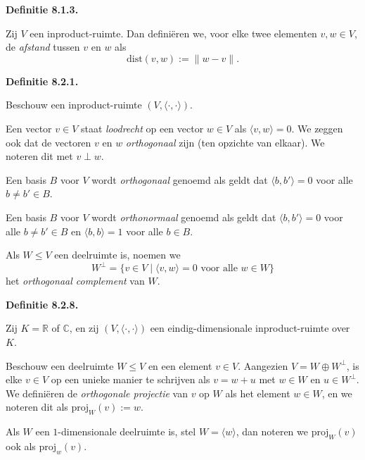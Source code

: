 \documentclass[10pt,a4paper]{article}
\newenvironment{res}[1]{%
  \par\noindent\textbf{Definitie #1.}~\ignorespaces
}{%
  \par\vspace{2pt}\normalfont
}
\begin{document}
\begin{res}{8.1.3}
Zij $V$ een inproduct-ruimte. Dan defini\"eren we, voor elke twee elementen $v,w\in V$, de \textit{afstand} tussen $v$ en $w$ als
\[
\mathrm{dist}(v,w):=\|w-v\|.
\]
\end{res}

\begin{res}{8.2.1}
Beschouw een inproduct-ruimte $(V,\langle\cdot,\cdot\rangle)$.
\begin{myenum}
\item Een vector $v\in V$ staat \textit{loodrecht} op een vector $w\in V$ als $\langle v,w\rangle=0$. We zeggen ook dat de vectoren $v$ en $w$ \textit{orthogonaal} zijn (ten opzichte van elkaar). We noteren dit met $v\perp w$.
\item Een basis $B$ voor $V$ wordt \textit{orthogonaal} genoemd als geldt dat $\langle b,b'\rangle=0$ voor alle $b\ne b'\in B$.
\item Een basis $B$ voor $V$ wordt \textit{orthonormaal} genoemd als geldt dat $\langle b,b'\rangle=0$ voor alle $b\ne b'\in B$ en $\langle b,b\rangle=1$ voor alle $b\in B$.
\item Als $W\le V$ een deelruimte is, noemen we
\[
W^\perp=\{v\in V\mid \langle v,w\rangle=0 \text{ voor alle } w\in W\}
\]
het \textit{orthogonaal complement} van $W$.
\end{myenum}
\end{res}

\begin{res}{8.2.8}
Zij $K=\mathbb R$ of $\mathbb C$, en zij $(V,\langle\cdot,\cdot\rangle)$ een eindig-dimensionale inproduct-ruimte over $K$.
\begin{myenum}
\item Beschouw een deelruimte $W\le V$ en een element $v\in V$. Aangezien $V=W\oplus W^\perp$, is elke $v\in V$ op een unieke manier te schrijven als $v=w+u$ met $w\in W$ en $u\in W^\perp$. We defini\"eren de \textit{orthogonale projectie} van $v$ op $W$ als het element $w\in W$, en we noteren dit als $\mathrm{proj}_W(v):=w$.
\item Als $W$ een $1$-dimensionale deelruimte is, stel $W=\langle w\rangle$, dan noteren we $\mathrm{proj}_W(v)$ ook als $\mathrm{proj}_w(v)$.
\end{myenum}
\end{res}
\end{document}
